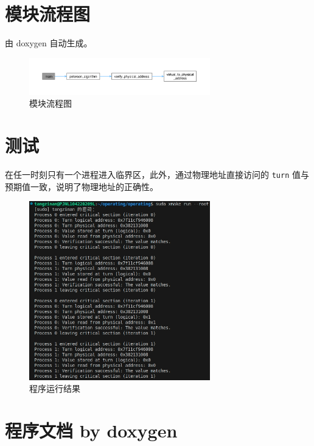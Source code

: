 \section{模块流程图}

由 doxygen 自动生成。

\begin{figure}[H]
    \centering
    \includegraphics[width=0.7\textwidth]{images/flow.pdf}
    \caption{模块流程图}
\end{figure}

\section{测试}

在任一时刻只有一个进程进入临界区，此外，通过物理地址直接访问的 \texttt{turn} 值与预期值一致，说明了物理地址的正确性。

\begin{figure}[H]
    \centering
    \includegraphics[width=0.7\textwidth]{images/res.jpeg}
    \caption{程序运行结果}
\end{figure}

\appendix

\section{程序文档 by doxygen}

